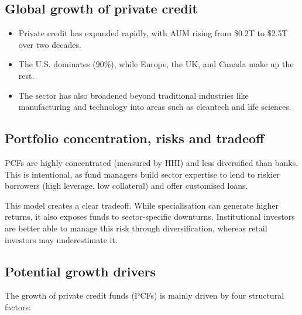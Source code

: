 \subsection*{Global growth of private credit}

\begin{itemize}
\item Private credit has expanded rapidly, with AUM rising from \$0.2T to \$2.5T over two
decades.
\item The U.S. dominates (90\%), while Europe, the UK, and Canada make up the rest.
\item The sector has also broadened beyond traditional industries like manufacturing and
technology into areas such as cleantech and life sciences.
\end{itemize}

\subsection*{Portfolio concentration, risks and tradeoff}

PCFs are highly concentrated (measured by HHI) and less diversified than banks. This is
intentional, as fund managers build sector expertise to lend to riskier borrowers (high
leverage, low collateral) and offer customised loans.

This model creates a clear tradeoff. While specialisation can generate higher returns, it
also exposes funds to sector-specific downturns. Institutional investors are better able to
manage this risk through diversification, whereas retail investors may underestimate it.


\subsection*{Potential growth drivers}

The growth of private credit funds (PCFs) is mainly driven by four structural factors:

